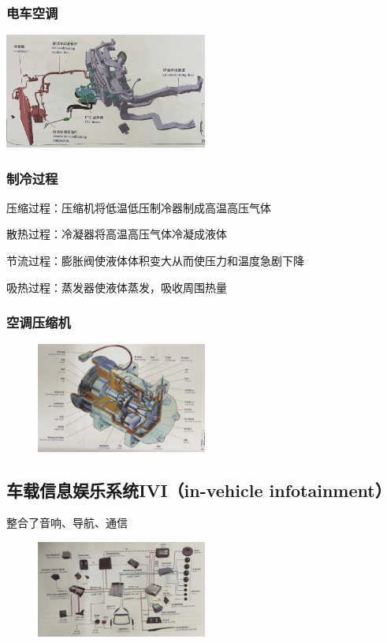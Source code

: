 	\subsubsection{电车空调}
		\begin{center}
			\includegraphics[width=0.5\textwidth]{5-20}
		\end{center}
	\subsubsection{制冷过程}
		压缩过程：压缩机将低温低压制冷器制成高温高压气体
		
		散热过程：冷凝器将高温高压气体冷凝成液体
		
		节流过程：膨胀阀使液体体积变大从而使压力和温度急剧下降
		
		吸热过程：蒸发器使液体蒸发，吸收周围热量
	\subsubsection{空调压缩机}
		\begin{figure}[htbp]
			\centering
			\includegraphics[width=0.5\textwidth]{5-21}
		\end{figure}

\subsection{车载信息娱乐系统IVI（in-vehicle infotainment）}
	整合了音响、导航、通信
	\begin{figure}[htbp]
		\centering
		\includegraphics[width=0.5\textwidth]{5-22}
	\end{figure}
